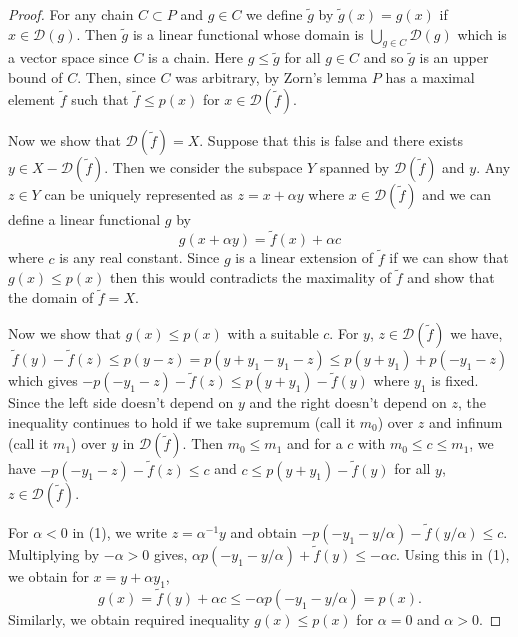 \documentclass[12pt]{article}
\newcommand{\al}{\alpha}
\newcommand{\cD}{\mathcal{D}}
\begin{document}
\begin{enumerate}
\begin{mybox}
\begin{proof}
        \vspace*{3mm}
        For any chain $C\subset P$ and $g\in C$ we define
        $\tilde{g}$ by $\tilde{g}(x)=g(x)$ if
        $x\in \cD(g)$. Then $\tilde{g}$ is a linear
        functional whose domain is $\bigcup_{g\in C}{
        \cD(g)}$ which is a vector space since $C$ is a
        chain. Here $g\leq \tilde{g}$ for all $g\in C$ and
        so $\tilde{g}$ is an upper bound of $C$. Then,
        since $C$ was arbitrary, by Zorn's lemma $P$ has
        a maximal element $\tilde{f}$ such that
        $\tilde{f}\leq p(x)$ for $x\in\cD(\tilde{f})$.

        \vspace*{3mm}
        Now we show that $\cD(\tilde{f})=X$. Suppose that
        this is false and there exists
        $y\in X-\cD(\tilde{f})$. Then we consider the subspace
        $Y$ spanned by $\cD(\tilde{f})$ and $y$. Any $z\in Y$
        can be uniquely represented as $z=x+\al y$ where
        $x\in \cD(\tilde{f})$ and we can define a linear
        functional $g$ by
        \begin{equation}
            g(x+\al y)=\tilde{f}(x)+\al c
        \end{equation}
        where $c$ is any real constant. Since $g$ is a linear
        extension of $\tilde{f}$ if we can show that $g(x)
        \leq p(x)$ then this would contradicts the maximality
        of $\tilde{f}$ and show that the domain of $\tilde{f}
        =X$.

        \vspace*{3mm}
        Now we show that $g(x)\leq p(x)$ with a suitable $c$.
        For $y$, $z\in \cD(\tilde{f})$ we have,
        $$\tilde{f}(y)-\tilde{f}(z)\leq p(y-z)=p(y+y_1-y_1-z)
        \leq p(y+y_1)+p(-y_1-z)$$
        which gives $-p(-y_1-z)-\tilde{f}(z)\leq p(y+y_1)
        -\tilde{f}(y)$ where $y_1$ is fixed. Since the left
        side doesn't depend on $y$ and the right doesn't
        depend on $z$, the inequality continues to hold if we
        take supremum (call it $m_0$) over $z$ and infinum
        (call it $m_1$) over $y$ in $\cD(\tilde{f})$. Then
        $m_0\leq m_1$ and for a $c$ with $m_0\leq c\leq m_1$,
        we have $-p(-y_1-z)-\tilde{f}(z)\leq c$ and
        $c\leq p(y+y_1)-\tilde{f}(y)$ for all $y$, $z
        \in \cD(\tilde{f})$.

        \vspace*{3mm}
        For $\alpha<0$ in (1), we write $z=\al^{-1}y$
        and obtain $-p(-y_1-y/\al)-\tilde{f}(y/\al)\leq c$.
        Multiplying by $-\al>0$ gives,
        $\al p(-y_1-y/\al)+\tilde{f}(y)\leq -\al c$. Using
        this in (1), we obtain for $x=y+\al y_1$,
        $$g(x)=\tilde{f}(y)+\al c\leq -\al p(-y_1-y/\al)
        =p(x).$$
        Similarly, we obtain required inequality
        $g(x)\leq p(x)$ for $\al=0$ and $\al>0$.


    \end{proof}
\end{mybox}
\end{enumerate}
\end{document}
